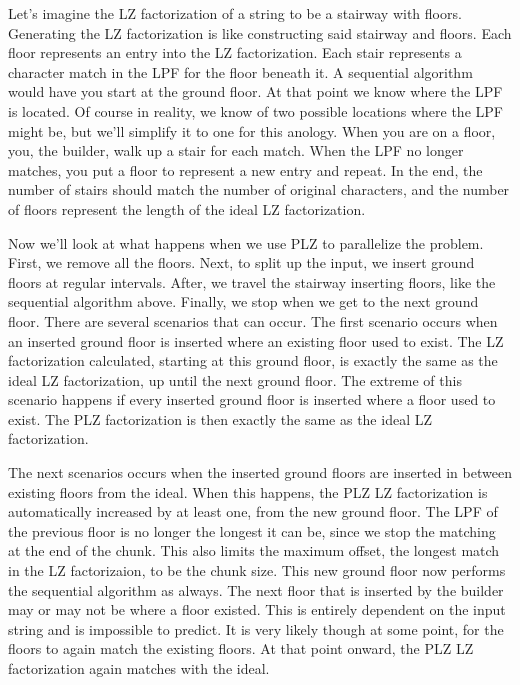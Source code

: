Let's imagine the LZ factorization of a string to be a stairway with floors.
Generating the LZ factorization is like constructing said stairway and floors.
Each floor represents an entry into the LZ factorization.
Each stair represents a character match in the LPF for the floor beneath it.
A sequential algorithm would have you start at the ground floor.
At that point we know where the LPF is located.
Of course in reality, we know of two possible locations where the LPF might be, but we'll simplify it to one for this anology.
When you are on a floor, you, the builder, walk up a stair for each match.
When the LPF no longer matches, you put a floor to represent a new entry and repeat.
In the end, the number of stairs should match the number of original characters, and the number of floors represent the length of the ideal LZ factorization.

Now we'll look at what happens when we use PLZ to parallelize the problem.
First, we remove all the floors.
Next, to split up the input, we insert ground floors at regular intervals.
After, we travel the stairway inserting floors, like the sequential algorithm above.
Finally, we stop when we get to the next ground floor.
There are several scenarios that can occur.
The first scenario occurs when an inserted ground floor is inserted where an existing floor used to exist.
The LZ factorization calculated, starting at this ground floor, is exactly the same as the ideal LZ factorization, up until the next ground floor.
The extreme of this scenario happens if every inserted ground floor is inserted where a floor used to exist.
The PLZ factorization is then exactly the same as the ideal LZ factorization.

The next scenarios occurs when the inserted ground floors are inserted in between existing floors from the ideal.
When this happens, the PLZ LZ factorization is automatically increased by at least one, from the new ground floor.
The LPF of the previous floor is no longer the longest it can be, since we stop the matching at the end of the chunk.
This also limits the maximum offset, the longest match in the LZ factorizaion, to be the chunk size.
This new ground floor now performs the sequential algorithm as always.
The next floor that is inserted by the builder may or may not be where a floor existed.
This is entirely dependent on the input string and is impossible to predict.
It is very likely though at some point, for the floors to again match the existing floors.
At that point onward, the PLZ LZ factorization again matches with the ideal.

